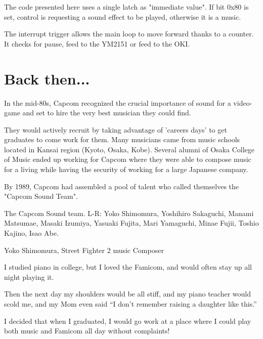 The code presented here uses a single latch as "immediate value". If bit 0x80 is set, control is requesting a sound effect to be played, otherwise it is a music. 


The interrupt trigger allows the main loop to move forward thanks to a counter. It checks for pause, feed to the YM2151 or feed to the OKI.








\section{Back then...}
In the mid-80s, Capcom recognized the crucial importance of sound for a video-game and set to hire the very best musician they could find.

They would actively recruit by taking advantage of 'careers days' to get graduates to come work for them. Many musicians came from music schools located in Kansai region (Kyoto, Osaka, Kobe). Several alumni of Osaka College of Music ended up working for Capcom where they were able to compose music for a living while having the security of working for a large Japanese company. 

By 1989, Capcom had assembled a pool of talent who called themselves the "Capcom Sound Team".


The Capcom Sound team. L-R: Yoko Shimomura, Yoshihiro Sakaguchi, Manami Matsumae, Masaki Izumiya, Yasuaki Fujita, Mari Yamaguchi, Minae Fujii, Toshio Kajino, Isao Abe.




\begin{q}{Yoko Shimomura, Street Fighter 2 music Composer\cite{beep199010}}

I studied piano in college, but I loved the Famicom, and would often stay up all night playing it. 

Then the next day my shoulders would be all stiff, and my piano teacher would scold me, and my Mom even said “I don’t remember raising a daughter like this.”

I decided that when I graduated, I would go work at a place where I could play both music and Famicom all day without complaints!
\end{q}


